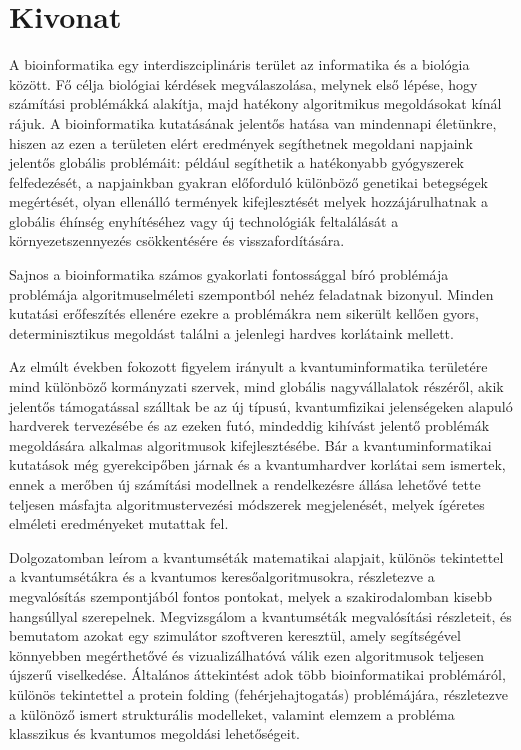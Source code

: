 \setcounter{page}{1}

\selecthungarian

\chapter*{Kivonat}

A bioinformatika egy interdiszciplináris terület az informatika és a biológia között. Fő célja biológiai kérdések megválaszolása, melynek első lépése, hogy számítási problémákká alakítja, majd hatékony algoritmikus megoldásokat kínál rájuk. A bioinformatika kutatásának jelentős hatása van mindennapi életünkre, hiszen az ezen a területen elért eredmények segíthetnek megoldani napjaink jelentős globális problémáit: például segíthetik a hatékonyabb gyógyszerek felfedezését, a napjainkban gyakran előforduló különböző genetikai betegségek megértését, olyan ellenálló termények kifejlesztését melyek hozzájárulhatnak a globális éhínség enyhítéséhez vagy új technológiák feltalálását a környezetszennyezés csökkentésére és visszafordítására.

Sajnos a bioinformatika számos gyakorlati fontossággal bíró problémája problémája algoritmuselméleti szempontból nehéz feladatnak bizonyul. Minden kutatási erőfeszítés ellenére ezekre a problémákra nem sikerült kellően gyors, determinisztikus megoldást találni a jelenlegi hardves korlátaink mellett.

Az elmúlt években fokozott figyelem irányult a kvantuminformatika területére mind különböző kormányzati szervek, mind globális nagyvállalatok részéről, akik jelentős támogatással szálltak be az új típusú, kvantumfizikai jelenségeken alapuló hardverek tervezésébe és az ezeken futó, mindeddig kihívást jelentő problémák megoldására alkalmas algoritmusok kifejlesztésébe. Bár a kvantuminformatikai kutatások még gyerekcipőben járnak és a kvantumhardver korlátai sem ismertek, ennek a merőben új számítási modellnek a rendelkezésre állása lehetővé tette teljesen másfajta algoritmustervezési módszerek megjelenését, melyek ígéretes elméleti eredményeket mutattak fel.

Dolgozatomban leírom a kvantumséták matematikai alapjait, különös tekintettel a kvantumsétákra és a kvantumos keresőalgoritmusokra, részletezve a megvalósítás szempontjából fontos pontokat, melyek a szakirodalomban kisebb hangsúllyal szerepelnek. Megvizsgálom a kvantumséták megvalósítási részleteit, és bemutatom azokat egy szimulátor szoftveren keresztül, amely segítségével könnyebben megérthetővé és vizualizálhatóvá válik ezen algoritmusok teljesen újszerű viselkedése. Általános áttekintést adok több bioinformatikai problémáról, különös tekintettel a protein folding (fehérjehajtogatás) problémájára, részletezve a különöző ismert strukturális modelleket, valamint elemzem a probléma klasszikus és kvantumos megoldási lehetőségeit.


